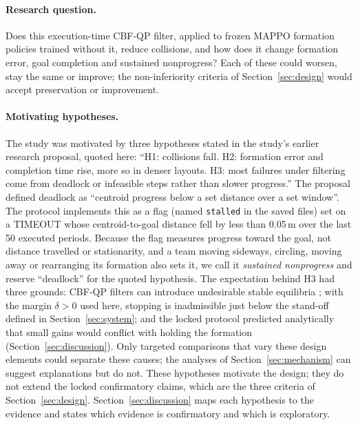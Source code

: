 \documentclass[journal]{IEEEtran}
\begin{document}
\paragraph{Research question.} Does this execution-time CBF-QP filter, applied to frozen MAPPO
formation policies trained without it, reduce collisions, and how does it change formation error,
goal completion and sustained nonprogress? Each of these could worsen, stay the same or improve; the
non-inferiority criteria of Section~\ref{sec:design} would accept preservation or improvement.

\paragraph{Motivating hypotheses.} The study was motivated by three hypotheses stated
in the study's earlier research proposal, quoted here: ``H1: collisions fall. H2: formation error and
completion time rise, more so in denser layouts. H3: most failures under filtering come from
deadlock or infeasible steps rather than slower progress.'' The proposal defined deadlock as ``centroid
progress below a set distance over a set window''. The protocol implements this as a flag (named
\texttt{stalled} in the saved files) set on a TIMEOUT whose centroid-to-goal distance fell by less than
0.05\,m over the last 50 executed periods. Because the flag measures progress toward the goal, not
distance travelled or stationarity, and a team moving sideways, circling, moving away or rearranging its
formation also sets it, we call it \emph{sustained nonprogress} and reserve ``deadlock'' for the quoted
hypothesis. The expectation behind H3 had three grounds: CBF-QP filters can introduce undesirable
stable equilibria \cite{reis2021,grover2023}; with the margin $\delta>0$ used here, stopping is
inadmissible just below the stand-off defined in Section~\ref{sec:system}; and the locked protocol
predicted analytically that small gains would conflict with holding the formation
(Section~\ref{sec:discussion}). Only targeted comparisons that vary these design elements could separate
these causes; the analyses of Section~\ref{sec:mechanism} can suggest explanations but do not. These hypotheses
motivate the design; they do not extend the locked confirmatory claims, which are the three
criteria of Section~\ref{sec:design}. Section~\ref{sec:discussion} maps each hypothesis to the
evidence and states which evidence is confirmatory and which is exploratory.
\end{document}
